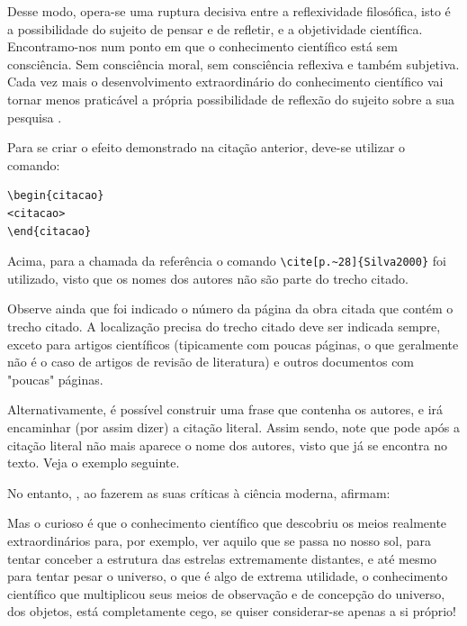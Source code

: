 \begin{apendicesenv}
\begin{citacao}
    Desse modo, opera-se uma ruptura decisiva entre a reflexividade filosófica, isto é a possibilidade do sujeito de pensar e de refletir, e a objetividade científica.     Encontramo-nos num ponto em que o conhecimento científico está sem consciência. Sem consciência moral, sem consciência reflexiva e também subjetiva. Cada vez mais o desenvolvimento extraordinário do conhecimento científico vai tornar menos praticável a própria possibilidade de reflexão do sujeito sobre a sua pesquisa \cite[p.~28]{Silva2000}.
\end{citacao}

Para se criar o efeito demonstrado na citação anterior, deve-se utilizar o comando:

\begin{verbatim}
\begin{citacao}
<citacao>
\end{citacao}
\end{verbatim}

Acima, para a chamada da referência o comando \verb|\cite[p.~28]{Silva2000}| foi utilizado, visto que os nomes dos autores não são parte do trecho citado.

Observe ainda que foi indicado o número da página da obra citada que contém o trecho citado. A localização precisa do trecho citado deve ser indicada sempre, exceto para artigos científicos (tipicamente com poucas páginas, o que geralmente não é o caso de artigos de revisão de literatura) e outros documentos com "poucas"{} páginas.

Alternativamente, é possível construir uma frase que contenha os autores, e irá encaminhar (por assim dizer) a citação literal. Assim sendo, note que pode após a citação literal não mais aparece o nome dos autores, visto que já se encontra no texto. Veja o exemplo seguinte.

No entanto, , ao fazerem as suas críticas à ciência moderna, afirmam:

\begin{citacao}
    Mas o curioso é que o conhecimento científico que descobriu os meios realmente extraordinários para, por exemplo, ver aquilo que se passa no nosso sol, para tentar conceber a estrutura das estrelas extremamente distantes, e até mesmo para tentar pesar o universo, o que é algo de extrema utilidade, o conhecimento científico que multiplicou seus meios de observação e de concepção do universo, dos objetos, está completamente cego, se quiser considerar-se apenas a si próprio!
\end{citacao}


\end{apendicesenv}
